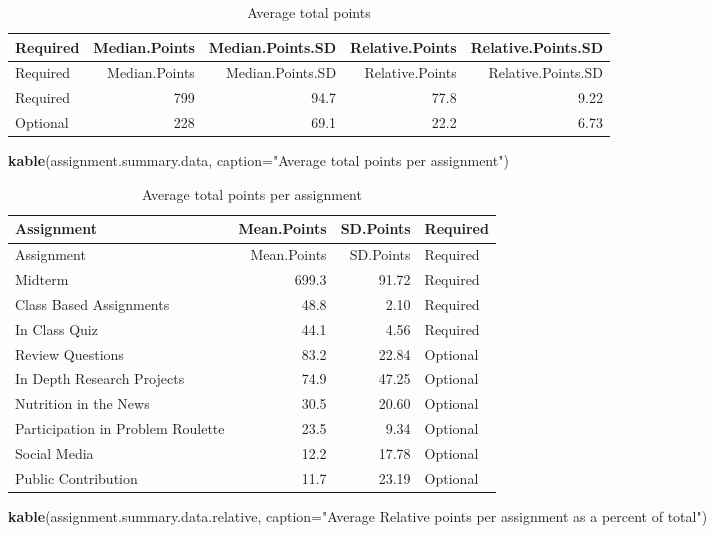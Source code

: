 \documentclass[]{article}
\newenvironment{Shaded}{\begin{snugshade}}{\end{snugshade}}
\newcommand{\KeywordTok}[1]{\textcolor[rgb]{0.13,0.29,0.53}{\textbf{#1}}}
\newcommand{\DataTypeTok}[1]{\textcolor[rgb]{0.13,0.29,0.53}{#1}}
\newcommand{\StringTok}[1]{\textcolor[rgb]{0.31,0.60,0.02}{#1}}
\newcommand{\NormalTok}[1]{#1}
\begin{document}
\begin{longtable}[]{@{}lrrrr@{}}
\caption{Average total points}\tabularnewline
\toprule
Required & Median.Points & Median.Points.SD & Relative.Points &
Relative.Points.SD\tabularnewline
\midrule
\endfirsthead
\toprule
Required & Median.Points & Median.Points.SD & Relative.Points &
Relative.Points.SD\tabularnewline
\midrule
\endhead
Required & 799 & 94.7 & 77.8 & 9.22\tabularnewline
Optional & 228 & 69.1 & 22.2 & 6.73\tabularnewline
\bottomrule
\end{longtable}

\begin{Shaded}
\begin{Highlighting}[]
\KeywordTok{kable}\NormalTok{(assignment.summary.data, }\DataTypeTok{caption=}\StringTok{"Average total points per assignment"}\NormalTok{)}
\end{Highlighting}
\end{Shaded}

\begin{longtable}[]{@{}lrrl@{}}
\caption{Average total points per assignment}\tabularnewline
\toprule
Assignment & Mean.Points & SD.Points & Required\tabularnewline
\midrule
\endfirsthead
\toprule
Assignment & Mean.Points & SD.Points & Required\tabularnewline
\midrule
\endhead
Midterm & 699.3 & 91.72 & Required\tabularnewline
Class Based Assignments & 48.8 & 2.10 & Required\tabularnewline
In Class Quiz & 44.1 & 4.56 & Required\tabularnewline
Review Questions & 83.2 & 22.84 & Optional\tabularnewline
In Depth Research Projects & 74.9 & 47.25 & Optional\tabularnewline
Nutrition in the News & 30.5 & 20.60 & Optional\tabularnewline
Participation in Problem Roulette & 23.5 & 9.34 &
Optional\tabularnewline
Social Media & 12.2 & 17.78 & Optional\tabularnewline
Public Contribution & 11.7 & 23.19 & Optional\tabularnewline
\bottomrule
\end{longtable}

\begin{Shaded}
\begin{Highlighting}[]
\KeywordTok{kable}\NormalTok{(assignment.summary.data.relative, }\DataTypeTok{caption=}\StringTok{"Average Relative points per assignment as a percent of total"}\NormalTok{)}
\end{Highlighting}
\end{Shaded}
\end{document}
